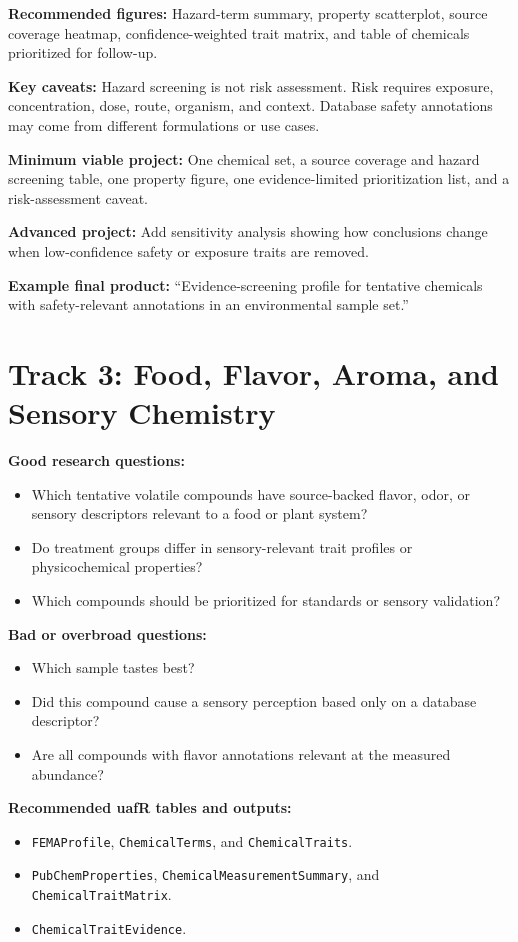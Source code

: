 \textbf{Recommended figures:} Hazard-term summary, property scatterplot, source coverage heatmap, confidence-weighted trait matrix, and table of chemicals prioritized for follow-up.

\textbf{Key caveats:} Hazard screening is not risk assessment. Risk requires exposure, concentration, dose, route, organism, and context. Database safety annotations may come from different formulations or use cases.

\textbf{Minimum viable project:} One chemical set, a source coverage and hazard screening table, one property figure, one evidence-limited prioritization list, and a risk-assessment caveat.

\textbf{Advanced project:} Add sensitivity analysis showing how conclusions change when low-confidence safety or exposure traits are removed.

\textbf{Example final product:} ``Evidence-screening profile for tentative chemicals with safety-relevant annotations in an environmental sample set.''

\section{Track 3: Food, Flavor, Aroma, and Sensory Chemistry}
\textbf{Good research questions:}
\begin{itemize}
  \item Which tentative volatile compounds have source-backed flavor, odor, or sensory descriptors relevant to a food or plant system?
  \item Do treatment groups differ in sensory-relevant trait profiles or physicochemical properties?
  \item Which compounds should be prioritized for standards or sensory validation?
\end{itemize}

\textbf{Bad or overbroad questions:}
\begin{itemize}
  \item Which sample tastes best?
  \item Did this compound cause a sensory perception based only on a database descriptor?
  \item Are all compounds with flavor annotations relevant at the measured abundance?
\end{itemize}

\textbf{Recommended uafR tables and outputs:}
\begin{itemize}
  \item \texttt{FEMAProfile}, \texttt{ChemicalTerms}, and \texttt{ChemicalTraits}.
  \item \texttt{PubChemProperties}, \texttt{ChemicalMeasurementSummary}, and \texttt{ChemicalTraitMatrix}.
  \item \texttt{ChemicalTraitEvidence}.
\end{itemize}

